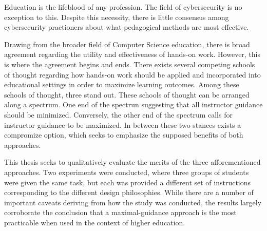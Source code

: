 \providecommand{\heading}[1]{\section{#1}}
\providecommand{\subheading}[1]{\subsection{#1}}

Education is the lifeblood of any profession. 
The field of cybersecurity is no exception to this. %
Despite this necessity, there is little consensus among cybersecurity practioners about what pedagogical methods are most effective.


Drawing from the broader field of Computer Science education, there is broad agreement regarding the utility and effectiveness of hands-on work. %
However, this is where the agreement begins and ends. %
There exists several competing schools of thought regarding how hands-on work should be applied and incorporated into educational settings in order to maximize learning outcomes. %
Among these schools of thought, three stand out. %
These schools of thought can be arranged along a spectrum. %
One end of the spectrun suggesting that all instructor guidance should be minimized. %
Conversely, the other end of the spectrum calls for instructor guidance to be maximized. %
In between these two stances exists a compromize option, which seeks to emphasize the supposed benefits of both approaches.

This thesis seeks to qualitatively evaluate the merits of the three afforementioned approaches. %
Two experiments were conducted, where three groups of students were given the same task, but each was provided a different set of instructions corresponding to the different design philosophies. %
While there are a number of important caveats deriving from how the study was conducted, the results largely corroborate the conclusion that a maximal-guidance approach is the most practicable when used in the context of higher education. 
